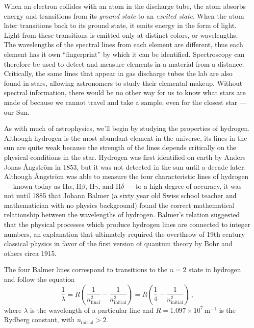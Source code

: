 When an electron collides with an atom in the discharge tube, the atom absorbs energy and transitions from its \textit{ground state} to an \textit{excited state}.
When the atom later transitions back to its ground state, it emits energy in the form of light.
Light from these transitions is emitted only at distinct colors, or wavelengths.
The wavelengths of the spectral lines from each element are different, thus each element has it own ``fingerprint'' by which it can be identified.
Spectroscopy can therefore be used to detect and measure elements in a material from a distance.
Critically, the same lines that appear in gas discharge tubes the lab are also found in stars, allowing astronomers to study their elemental makeup.
Without spectral information, there would be no other way for us to know what stars are made of because we cannot travel and take a sample, even for the closest star --- our Sun.

As with much of astrophysics, we'll begin by studying the properties of hydrogen.
Although hydrogen is the most abundant element in the universe, its lines in the sun are
quite weak because the strength of the lines depends critically on the physical conditions
in the star. Hydrogen was first identified on earth by Anders Jonas Ångström in 1853, but
it was not detected in the sun until a decade later. Although Ångström was able to
measure the four characteristic lines of hydrogen --- known today as H$\alpha$, H$\beta$, H$\gamma$, and H$\delta$ --- to a high degree of accuracy, it was not until 1885 that Johann Balmer (a sixty year old
Swiss school teacher and mathematician with no physics background) found the correct
mathematical relationship between the wavelengths of hydrogen. Balmer's relation suggested that the physical processes which produce hydrogen lines are connected to
integer numbers, an explanation that ultimately required the overthrow of 19th century
classical physics in favor of the first version of quantum theory by Bohr and others circa
1915.

The four Balmer lines correspond to transitions to the $n=2$ state in hydrogen %
and follow the equation
\begin{equation}\label{spec:eqn:balmer}
 \frac{1}{\lambda} = R \left( \frac{1}{n^2_\textrm{final}} - \frac{1}{n^2_\textrm{initial}} \right)
 = R \left( \frac{1}{4} - \frac{1}{n^2_\textrm{initial}} \right) \,,
\end{equation}
where $\lambda$ is the wavelength of a particular line and $R = 1.097 \times 10^7\:\mathrm{m}^{-1}$ is the Rydberg constant, with $n_\textrm{initial}>2$.

